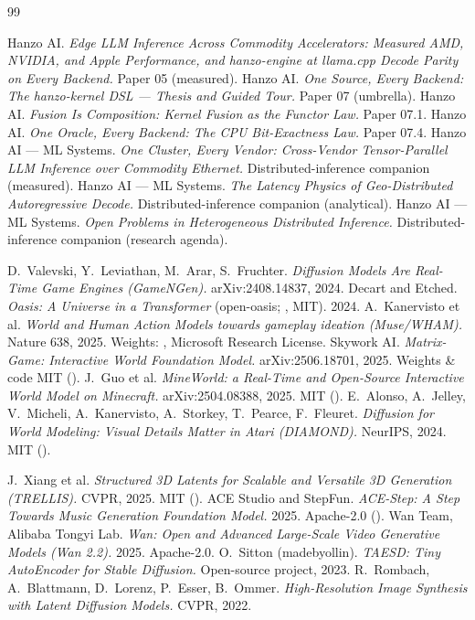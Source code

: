 \documentclass[11pt]{article}
\begin{document}
\begin{thebibliography}{99}
\small

 Hanzo AI. \emph{Edge LLM Inference Across Commodity Accelerators: Measured AMD, NVIDIA, and
Apple Performance, and hanzo-engine at llama.cpp Decode Parity on Every Backend.} Paper 05 (measured).
 Hanzo AI. \emph{One Source, Every Backend: The hanzo-kernel DSL --- Thesis and Guided
Tour.} Paper 07 (umbrella).
 Hanzo AI. \emph{Fusion Is Composition: Kernel Fusion as the Functor Law.} Paper 07.1.
 Hanzo AI. \emph{One Oracle, Every Backend: The CPU Bit-Exactness Law.} Paper 07.4.
 Hanzo AI --- ML Systems. \emph{One Cluster, Every Vendor: Cross-Vendor Tensor-Parallel LLM
Inference over Commodity Ethernet.} Distributed-inference companion (measured).
 Hanzo AI --- ML Systems. \emph{The Latency Physics of Geo-Distributed Autoregressive
Decode.} Distributed-inference companion (analytical).
 Hanzo AI --- ML Systems. \emph{Open Problems in Heterogeneous Distributed Inference.}
Distributed-inference companion (research agenda).

 D.\ Valevski, Y.\ Leviathan, M.\ Arar, S.\ Fruchter. \emph{Diffusion Models Are Real-Time
Game Engines (GameNGen).} arXiv:2408.14837, 2024.
 Decart and Etched. \emph{Oasis: A Universe in a Transformer} (open-oasis; ,
MIT). 2024.
 A.\ Kanervisto et al. \emph{World and Human Action Models towards gameplay ideation (Muse/WHAM).}
Nature 638, 2025. Weights: , Microsoft Research License.
 Skywork AI. \emph{Matrix-Game: Interactive World Foundation Model.} arXiv:2506.18701, 2025.
Weights \& code MIT ().
 J.\ Guo et al. \emph{MineWorld: a Real-Time and Open-Source Interactive World Model on
Minecraft.} arXiv:2504.08388, 2025. MIT ().
 E.\ Alonso, A.\ Jelley, V.\ Micheli, A.\ Kanervisto, A.\ Storkey, T.\ Pearce, F.\ Fleuret.
\emph{Diffusion for World Modeling: Visual Details Matter in Atari (DIAMOND).} NeurIPS, 2024. MIT
().

 J.\ Xiang et al. \emph{Structured 3D Latents for Scalable and Versatile 3D Generation
(TRELLIS).} CVPR, 2025. MIT ().
 ACE Studio and StepFun. \emph{ACE-Step: A Step Towards Music Generation Foundation Model.}
2025. Apache-2.0 ().
 Wan Team, Alibaba Tongyi Lab. \emph{Wan: Open and Advanced Large-Scale Video Generative Models
(Wan 2.2).} 2025. Apache-2.0.
 O.\ Sitton (madebyollin). \emph{TAESD: Tiny AutoEncoder for Stable Diffusion.} Open-source
project, 2023.
 R.\ Rombach, A.\ Blattmann, D.\ Lorenz, P.\ Esser, B.\ Ommer. \emph{High-Resolution Image
Synthesis with Latent Diffusion Models.} CVPR, 2022.


\end{thebibliography}
\end{document}
